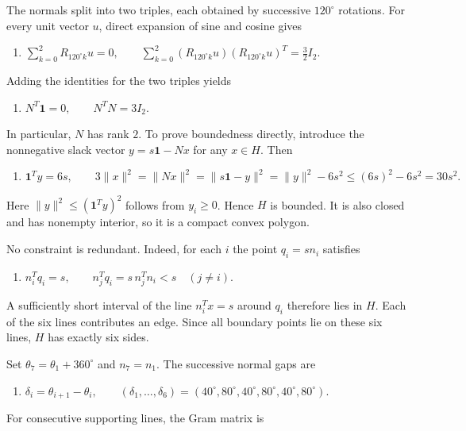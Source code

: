 \begin{enumerate}
 The normals split into two triples, each obtained by successive $120^\circ$ rotations. For every unit vector $u$, direct expansion of sine and cosine gives

 
            \begin{enumerate}[label=(\roman*)]
                \item $\sum_{k=0}^{2}R_{120^\circ k}u=0,\qquad \sum_{k=0}^{2}(R_{120^\circ k}u)(R_{120^\circ k}u)^T =\frac32 I_2.$
            \end{enumerate}
            Adding the identities for the two triples yields

 
            \begin{enumerate}[label=(\roman*)]
                \item $N^T\mathbf1=0,\qquad N^TN=3I_2.$
            \end{enumerate}
            In particular, $N$ has rank $2$. To prove boundedness directly, introduce the nonnegative slack vector $y=s\mathbf1-Nx$ for any $x\in H$. Then

 
            \begin{enumerate}[label=(\roman*)]
                \item $\mathbf1^Ty=6s,\qquad 3\|x\|^2=\|Nx\|^2 =\|s\mathbf1-y\|^2 =\|y\|^2-6s^2 \le (6s)^2-6s^2=30s^2.$
            \end{enumerate}
            Here $\|y\|^2\le(\mathbf1^Ty)^2$ follows from $y_i\ge0$. Hence $H$ is bounded. It is also closed and has nonempty interior, so it is a compact convex polygon.

 No constraint is redundant. Indeed, for each $i$ the point $q_i=sn_i$ satisfies

 
            \begin{enumerate}[label=(\roman*)]
                \item $n_i^Tq_i=s,\qquad n_j^Tq_i=s\,n_j^Tn_i<s\quad(j\ne i).$
            \end{enumerate}
            A sufficiently short interval of the line $n_i^Tx=s$ around $q_i$ therefore lies in $H$. Each of the six lines contributes an edge. Since all boundary points lie on these six lines, $H$ has exactly six sides.

 Set $\theta_7=\theta_1+360^\circ$ and $n_7=n_1$. The successive normal gaps are

 
            \begin{enumerate}[label=(\roman*)]
                \item $\delta_i=\theta_{i+1}-\theta_i,\qquad (\delta_1,\ldots,\delta_6) =(40^\circ,80^\circ,40^\circ,80^\circ,40^\circ,80^\circ).$
            \end{enumerate}
            For consecutive supporting lines, the Gram matrix is


\end{enumerate}
